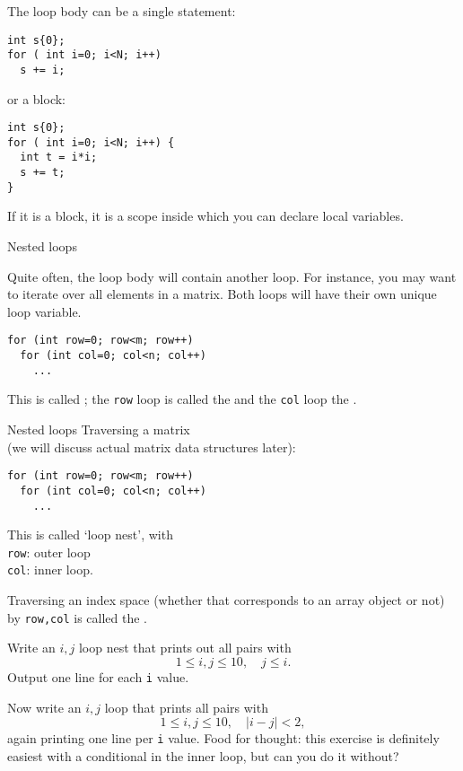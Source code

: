 The loop body can be a single statement:
\begin{lstlisting}
int s{0};
for ( int i=0; i<N; i++)
  s += i;
\end{lstlisting}
or a block:
\begin{lstlisting}
int s{0};
for ( int i=0; i<N; i++) {
  int t = i*i;
  s += t;
}
\end{lstlisting}
If it is a block, it is a scope inside which you can declare local variables.

 {Nested loops}

Quite often, the loop body will contain another loop. For instance,
you may want to iterate over all elements in a matrix. Both loops will
have their own unique loop variable.
\begin{lstlisting}
for (int row=0; row<m; row++)
  for (int col=0; col<n; col++)
    ...
\end{lstlisting}
This is called ; 
the \lstinline{row} loop is called the  and the
\lstinline{col} loop the .

\begin{slide}{Nested loops}
  \label{sl:for-nest}
  Traversing a matrix\\
  (we will discuss actual matrix data structures later):
\begin{lstlisting}
for (int row=0; row<m; row++)
  for (int col=0; col<n; col++)
    ...
\end{lstlisting}
This is called `loop nest', with\\
\lstinline{row}: outer loop\\
\lstinline{col}: inner loop.
\end{slide}

Traversing an index space (whether that corresponds to an array object
or not) by \lstinline{row,col} is called the .

\begin{exercise}
  \label{ex:ij-triangle}
  Write an $i,j$ loop nest that prints out all pairs with
  \[ 1\leq i,j\leq 10,\quad  j\leq i. \]
  Output one line for each \lstinline{i} value.

  Now write an $i,j$ loop that prints all pairs with
  \[ 1\leq i,j\leq 10,\quad |i-j|<2, \]
  again printing one line per \lstinline{i} value.
  Food for thought: this exercise is definitely easiest with a
  conditional in the inner loop, but can you do
  it without? 
\end{exercise}

